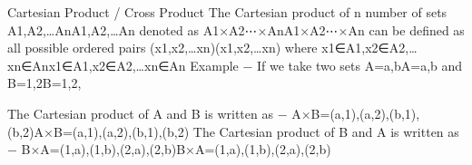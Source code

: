 Cartesian Product / Cross Product
The Cartesian product of n number of sets A1,A2,…AnA1,A2,…An denoted as A1×A2⋯×AnA1×A2⋯×An can be defined as all possible ordered pairs (x1,x2,…xn)(x1,x2,…xn) where x1∈A1,x2∈A2,…xn∈Anx1∈A1,x2∈A2,…xn∈An
Example − If we take two sets A={a,b}A={a,b} and B={1,2}B={1,2},

The Cartesian product of A and B is written as − A×B={(a,1),(a,2),(b,1),(b,2)}A×B={(a,1),(a,2),(b,1),(b,2)}
The Cartesian product of B and A is written as − B×A={(1,a),(1,b),(2,a),(2,b)}B×A={(1,a),(1,b),(2,a),(2,b)}
